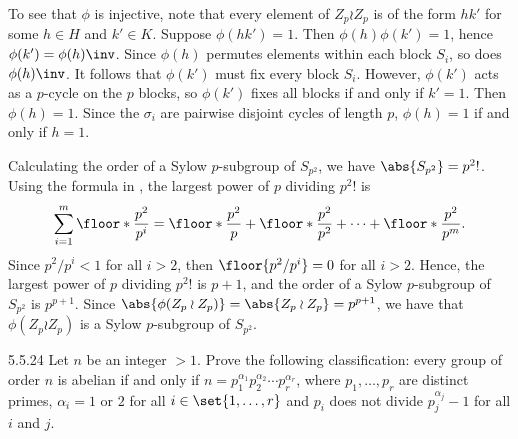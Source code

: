 \begin{solenum}
    To see that $\phi$ is injective, note that every element of $Z_p \wr Z_p$ is of the form $hk'$ for some $h \in H$ and $k' \in K$.
    Suppose $\phi(hk') = 1$.
    Then $\phi(h)\phi(k') = 1$, hence $\phi(k') = \phi(h)\inv$.
    Since $\phi(h)$ permutes elements within each block $S_i$, so does $\phi(h)\inv$.
    It follows that $\phi(k')$ must fix every block $S_i$.
    However, $\phi(k')$ acts as a $p$-cycle on the $p$ blocks, so $\phi(k')$ fixes all blocks if and only if $k' = 1$.
    Then $\phi(h) = 1$.
    Since the $\sigma_i$ are pairwise disjoint cycles of length $p$, $\phi(h) = 1$ if and only if $h = 1$.

    Calculating the order of a Sylow $p$-subgroup of $S_{p^2}$, we have $\abs{S_{p^2}} = p^2!$.
    Using the formula in , the largest power of $p$ dividing $p^2!$ is
    \[
        \sum_{i=1}^m \floor*{\frac{p^2}{p^i}} = \floor*{\frac{p^2}{p}} + \floor*{\frac{p^2}{p^2}} + \cdots + \floor*{\frac{p^2}{p^m}}.
    \]
    Since $p^2/p^i < 1$ for all $i > 2$, then $\floor{p^2/p^i} = 0$ for all $i > 2$.
    Hence, the largest power of $p$ dividing $p^2!$ is $p + 1$, and the order of a Sylow $p$-subgroup of $S_{p^2}$ is $p^{p + 1}$.
    Since $\abs{\phi(Z_p \wr Z_p)} = \abs{Z_p \wr Z_p} = p^{p + 1}$, we have that $\phi(Z_p \wr Z_p)$ is a Sylow $p$-subgroup of $S_{p^2}$.
\end{solenum}

\begin{exercise}{5.5.24}
    Let $n$ be an integer $> 1$.
	Prove the following classification: every group of order $n$ is abelian if and only if $n = p_1^{\alpha_1} p_2^{\alpha_2} \cdots p_r^{\alpha_r}$, where $p_1, \ldots, p_r$ are distinct primes, $\alpha_i = 1$ or $2$ for all $i \in \set{1, \ldots, r}$ and $p_i$ does not divide $p_j^{\alpha_j} - 1$ for all $i$ and $j$.
\end{exercise}

